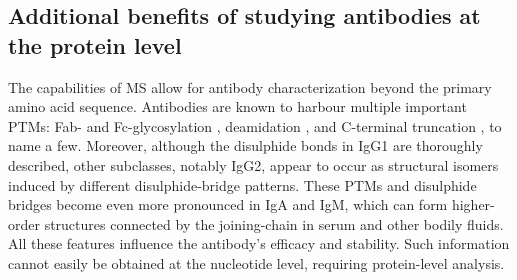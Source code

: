 \subsection{Additional benefits of studying antibodies at the protein level}
The capabilities of MS allow for antibody characterization beyond the primary amino acid sequence. Antibodies are known to harbour multiple important PTMs: Fab- and Fc-glycosylation \cite{haan2020monitoring}, deamidation \cite{yan2018structure}, and C-terminal truncation \cite{beyer2018microheterogeneity}, to name a few. Moreover, although the disulphide bonds in IgG1 are thoroughly described, other subclasses, notably IgG2, appear to occur as structural isomers induced by different disulphide-bridge patterns. These PTMs and disulphide bridges become even more pronounced in IgA and IgM, which can form higher-order structures connected by the joining-chain in serum and other bodily fluids. All these features influence the antibody’s efficacy and stability. Such information cannot easily be obtained at the nucleotide level, requiring protein-level analysis.
\clearpage

